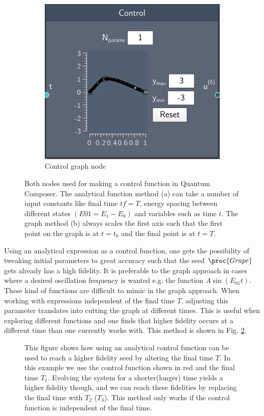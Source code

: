 \documentclass[a4paper, twocolumn]{revtex4-1}
\begin{document}
\begin{figure}[h]
\begin{subfigure}[b]{0.45\columnwidth}
		\includegraphics[width=\columnwidth]{graphics/composerScreens/ControlNode.png}
		\caption{Control graph node}
	\end{subfigure}
	\caption{Both nodes used for making a control function in Quantum Composer. The analytical function method (a) can take a number of input constants like final time $tf = T$, energy spacing between different states $(E01 = E_1 - E_0)$ and variables such as time $t$. The graph method (b) always scales the first axis such that the first point on the graph is at $t=t_0$ and the final point is at $t=T$.}
	\label{fig:Controls}
\end{figure}

Using an analytical expression as a control function, one gets the possibility of tweaking initial parameters to great accuracy such that the seed $\proc{Grape}$ gets already has a high fidelity. It is preferable to the graph approach in cases where a desired oscillation frequency is wanted e.g. the function $A\sin(E_{01}t)$. These kind of functions are difficult to mimic in the graph approach. When working with expressions independent of the final time $T$, adjusting this parameter translates into cutting the graph at different times. This is useful when exploring different functions and one finds that higher fidelity occurs at a different time than one currently works with. This method is shown in Fig. \ref{fig:funcAppr}. \\
\begin{figure}
	\def\svgwidth{\columnwidth}
	
	\caption{This figure shows how using an analytical control function can be used to reach a higher fidelity seed by altering the final time $T$. In this example we use the control function shown in red and the final time $T_1$. Evolving the system for a shorter(longer) time yields a higher fidelity though, and we can reach these fidelities by replacing the final time with $T_2$ ($T_3$). This method only works if the control function is independent of the final time.}
	\label{fig:funcAppr}
\end{figure}
\end{document}
